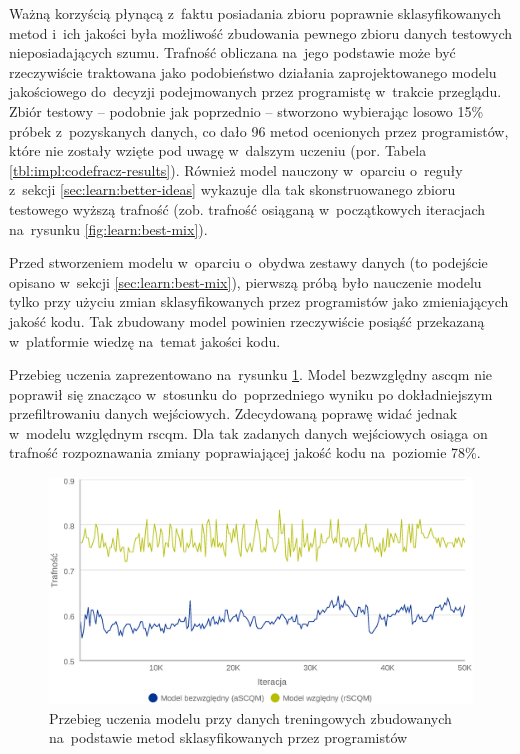 \documentclass[twoside]{praca}
\begin{document}
Ważną korzyścią płynącą z~faktu posiadania zbioru poprawnie sklasyfikowanych metod i~ich jakości była możliwość zbudowania pewnego zbioru danych testowych nieposiadających szumu. Trafność obliczana na~jego podstawie może być rzeczywiście traktowana jako podobieństwo działania zaprojektowanego modelu jakościowego do~decyzji podejmowanych przez programistę w~trakcie przeglądu. Zbiór testowy -- podobnie jak poprzednio -- stworzono wybierając losowo 15\% próbek z~pozyskanych danych, co dało 96 metod ocenionych przez programistów, które nie zostały wzięte pod uwagę w~dalszym uczeniu (por. Tabela \ref{tbl:impl:codefracz-results}). Również model nauczony w~oparciu o~reguły z~sekcji \ref{sec:learn:better-ideas} wykazuje dla tak skonstruowanego zbioru testowego wyższą trafność (zob. trafność osiąganą w~początkowych iteracjach na~rysunku \ref{fig:learn:best-mix}).

Przed stworzeniem modelu w~oparciu o~obydwa zestawy danych (to podejście opisano w~sekcji \ref{sec:learn:best-mix}), pierwszą próbą było nauczenie modelu tylko przy użyciu zmian sklasyfikowanych przez programistów jako zmieniających jakość kodu. Tak zbudowany model powinien rzeczywiście posiąść przekazaną w~platformie wiedzę na~temat jakości kodu.

Przebieg uczenia zaprezentowano na~rysunku \ref{fig:learn:expert}. Model bezwzględny \gls{ascqm} nie poprawił się znacząco w~stosunku do~poprzedniego wyniku po dokładniejszym przefiltrowaniu danych wejściowych. Zdecydowaną poprawę widać jednak w~modelu względnym \gls{rscqm}. Dla tak zadanych danych wejściowych osiąga on trafność rozpoznawania zmiany poprawiającej jakość kodu na~poziomie 78\%.

\begin{figure}[h!]
\centering
\includegraphics[width=\textwidth]{learn/expert-only.eps}
\caption{Przebieg uczenia modelu przy danych treningowych zbudowanych na~podstawie metod sklasyfikowanych przez programistów}
\label{fig:learn:expert}
\end{figure}
\end{document}
